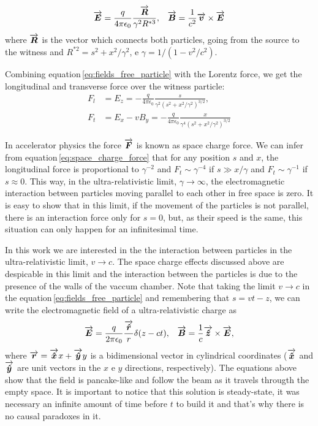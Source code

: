 \begin{align}\label{eq:fields_free_particle}
    \overrightarrow{\boldsymbol{E}} = \frac{q}{4\pi\epsilon_0}\frac{\overrightarrow{\boldsymbol{R}}}{\gamma^2 R^{*3}}, & & \overrightarrow{\boldsymbol{B}} = \frac{1}{c^2}\overrightarrow{\boldsymbol{v}} \times \overrightarrow{\boldsymbol{E}}
\end{align}
where $\overrightarrow{\boldsymbol{R}}$ is the vector which connects both particles, going from the source to the witness and  $R^{*2} = s^2 + x^2/\gamma^2$, e $\gamma = 1/(1-v^2/c^2)$.

Combining equation\,\ref{eq:fields_free_particle} with the Lorentz force, we get the longitudinal and transverse force over the witness particle:
\begin{align}\label{eq:space_charge_force}
    F_l &= E_z = -\frac{q}{4\pi\epsilon_0}\frac{s}{\gamma^2\left(s^2+x^2/\gamma^2\right)^{3/2}}, \\
    F_t &= E_x - vB_y = -\frac{q}{4\pi\epsilon_0}\frac{x}{\gamma^4\left(s^2+x^2/\gamma^2\right)^{3/2}}
\end{align}

In accelerator physics the force $\overrightarrow{\boldsymbol{F}}$ is known as space charge force. We can infer from equation\,\ref{eq:space_charge_force} that for any position $s$ and $x$, the longitudinal force is proportional to $\gamma^{-2}$ and $F_t \sim \gamma^{-4}$ if $s \gg x/\gamma$ and  $F_t \sim \gamma^{-1}$ if $s \approx 0$. This way, in the ultra-relativistic limit, $\gamma \to \infty$, the electromagnetic interaction between particles moving parallel to each other in free space is zero. It is easy to show that in this limit, if the movement of the particles is not parallel, there is an interaction force only for $s=0$, but, as their speed is the same, this situation can only happen for an infinitesimal time.

In this work we are interested in the the interaction between particles in the ultra-relativistic limit, $v \to c$. The space charge effects discussed above are despicable in this limit and the interaction between the particles is due to the presence of the walls of the vaccum chamber. Note that taking the limit $v \to c$ in the equation\,\ref{eq:fields_free_particle} and remembering that $s = vt - z$, we can write the electromagnetic field of a ultra-relativistic charge as
\begin{align}
    \overrightarrow{\boldsymbol{E}} = \frac{q}{2\pi\epsilon_0}\frac{\overrightarrow{\boldsymbol{\hat{r}}}}{r}\delta(z-ct), & & \overrightarrow{\boldsymbol{B}} =\frac{1}{c}\overrightarrow{\boldsymbol{\hat{z}}}\times\overrightarrow{\boldsymbol{E}},
\end{align}
where $\overrightarrow{\boldsymbol{r}} = \overrightarrow{\boldsymbol{\hat{x}}}x + \overrightarrow{\boldsymbol{\hat{y}}}y$ is a bidimensional vector in cylindrical coordinates ($\overrightarrow{\boldsymbol{\hat{x}}}$ and $\overrightarrow{\boldsymbol{\hat{y}}}$ are unit vectors in the $x$ e $y$ directions, respectively). The equations above show that the field is pancake-like and follow the beam as it travels througth the empty space. It is important to notice that this solution is steady-state, it was necessary an infinite amount of time before $t$ to build it and that's why there is no causal paradoxes in it.

